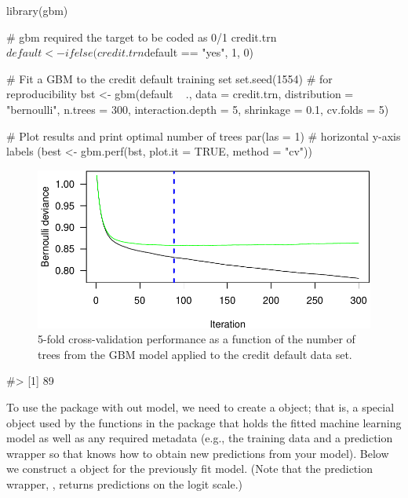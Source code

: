 \begin{Schunk}
\begin{Sinput}
library(gbm)

# gbm required the target to be coded as 0/1
credit.trn$default <- ifelse(credit.trn$default == "yes", 1, 0)

# Fit a GBM to the credit default training set
set.seed(1554)  # for reproducibility
bst <- gbm(default ~ ., data = credit.trn, distribution = "bernoulli", 
           n.trees = 300, interaction.depth = 5, shrinkage = 0.1, cv.folds = 5)

# Plot results and print optimal number of trees
par(las = 1)  # horizontal y-axis labels
(best <- gbm.perf(bst, plot.it = TRUE, method = "cv"))
\end{Sinput}
\begin{figure}[!htb]

{\centering \includegraphics[width=1\linewidth]{greenwell_files/figure-latex/ex-credit-gbm-1} 

}

\caption[5-fold cross-validation performance as a function of the number of trees from the GBM model applied to the credit default data set]{5-fold cross-validation performance as a function of the number of trees from the GBM model applied to the credit default data set.}\label{fig:ex-credit-gbm}
\end{figure}
\begin{Soutput}
#> [1] 89
\end{Soutput}
\end{Schunk}

To use the  package with out  model, we need to create
a  object; that is, a special object used by the
functions in the  package that holds the fitted machine
learning model as well as any required metadata (e.g., the training data
and a prediction wrapper so that  knows how to obtain new
predictions from your model). Below we construct a 
object for the previously fit  model. (Note that the prediction
wrapper, , returns predictions on the logit scale.)

